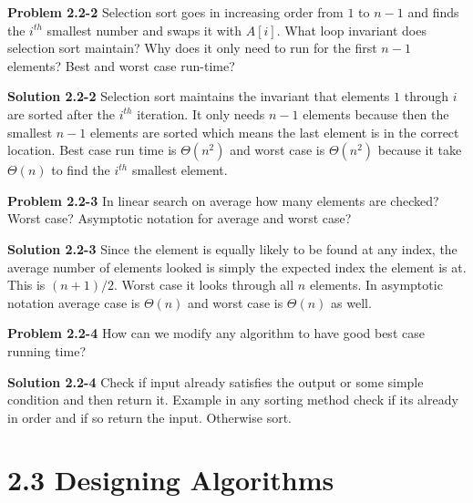 \documentclass{article}
\begin{document}
\hrulefill

\medskip

\textbf{Problem 2.2-2} Selection sort goes in increasing order from $1$ to $n - 1$ and finds the $i^{th}$ smallest number and swaps it with $A[i]$. What loop invariant does selection sort maintain? Why does it only need to run for the first $n - 1$ elements? Best and worst case run-time?

\medskip

\textbf{Solution 2.2-2} Selection sort maintains the invariant that elements $1$ through $i$ are sorted after the $i^{th}$ iteration. It only needs $n-1$ elements because then the smallest $n-1$ elements are sorted which means the last element is in the correct location. Best case run time is $\boxed{\Theta(n^2)}$ and worst case is $\boxed{\Theta(n^2)}$ because it take $\Theta(n)$ to find the $i^{th}$ smallest element.

\hrulefill

\medskip

\textbf{Problem 2.2-3} In linear search on average how many elements are checked? Worst case? Asymptotic notation for average and worst case?

\medskip

\textbf{Solution 2.2-3} Since the element is equally likely to be found at any index, the average number of elements looked is simply the expected index the element is at. This is $\boxed{(n+1)/2}$. Worst case it looks through all $\boxed{n}$ elements. In asymptotic notation average case is $\boxed{\Theta(n)}$ and worst case is $\boxed{\Theta(n)}$ as well.

\hrulefill

\medskip

\textbf{Problem 2.2-4} How can we modify any algorithm to have good best case running time?

\medskip

\textbf{Solution 2.2-4} Check if input already satisfies the output or some simple condition and then return it. Example in any sorting method check if its already in order and if so return the input. Otherwise sort.

\hrulefill

\section*{2.3 Designing Algorithms}

\hrulefill

\medskip
\end{document}

